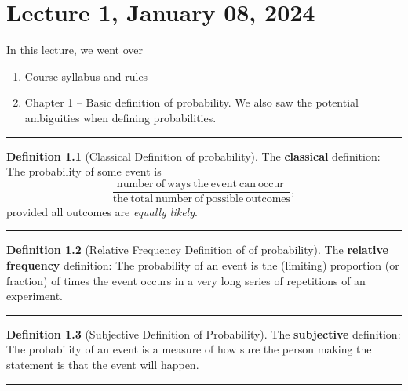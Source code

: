 \documentclass[
]{book}
\providecommand{\tightlist}{%
  \setlength{\itemsep}{0pt}\setlength{\parskip}{0pt}}
\theoremstyle{definition}
\newtheorem{definition}{Definition}[chapter]
\theoremstyle{definition}
\theoremstyle{definition}
\theoremstyle{definition}
\theoremstyle{remark}
\begin{document}
\chapter{Lecture 1, January 08, 2024}\label{lecture-1-january-08-2024}

In this lecture, we went over

\begin{enumerate}
\def\labelenumi{\arabic{enumi}.}
\tightlist
\item
  Course syllabus and rules
\item
  Chapter 1 -- Basic definition of probability. We also saw the potential ambiguities when defining probabilities.
\end{enumerate}

\begin{center}\rule{0.5\linewidth}{0.5pt}\end{center}

\begin{definition}[Classical Definition of probability]
The \textbf{classical} definition: The probability of some event is
\[
\frac{\mathrm{number~of~ways~the~event~can~occur~}}
{\mathrm{{the~total~number~of~possible~outcomes}}},
\]
provided all outcomes are \emph{equally likely}.
\end{definition}

\begin{center}\rule{0.5\linewidth}{0.5pt}\end{center}

\begin{definition}[Relative Frequency Definition of of probability]
The \textbf{relative frequency} definition: The probability of an event
is the (limiting) proportion (or fraction) of times the event occurs in a very
long series of repetitions of an experiment.
\end{definition}

\begin{center}\rule{0.5\linewidth}{0.5pt}\end{center}

\begin{definition}[Subjective Definition of Probability]
The \textbf{subjective} definition: The probability of an event is a measure of how sure the person making the statement is that the event will happen.
\end{definition}

\begin{center}\rule{0.5\linewidth}{0.5pt}\end{center}
\end{document}
